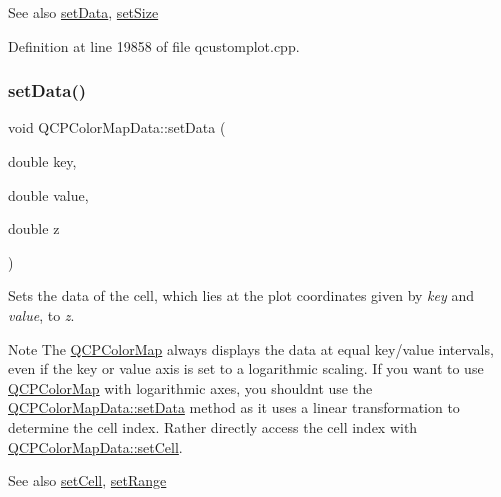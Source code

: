 \begin{DoxySeeAlso}{See also}
\hyperlink{class_q_c_p_color_map_data_afd2083ccfd6987ec94aa7ef8e91ca39a}{set\+Data}, \hyperlink{class_q_c_p_color_map_data_a0d9ff35c299d0478b682bfbcdd9c097e}{set\+Size} 
\end{DoxySeeAlso}


Definition at line 19858 of file qcustomplot.\+cpp.

\mbox{\label{class_q_c_p_color_map_data_afd2083ccfd6987ec94aa7ef8e91ca39a}} 
\subsubsection{\texorpdfstring{set\+Data()}{setData()}}
{\footnotesize\ttfamily void Q\+C\+P\+Color\+Map\+Data\+::set\+Data (\begin{DoxyParamCaption}\item[{double}]{key,  }\item[{double}]{value,  }\item[{double}]{z }\end{DoxyParamCaption})}

Sets the data of the cell, which lies at the plot coordinates given by {\itshape key} and {\itshape value}, to {\itshape z}.

\begin{DoxyNote}{Note}
The \hyperlink{class_q_c_p_color_map}{Q\+C\+P\+Color\+Map} always displays the data at equal key/value intervals, even if the key or value axis is set to a logarithmic scaling. If you want to use \hyperlink{class_q_c_p_color_map}{Q\+C\+P\+Color\+Map} with logarithmic axes, you shouldn\textquotesingle{}t use the \hyperlink{class_q_c_p_color_map_data_afd2083ccfd6987ec94aa7ef8e91ca39a}{Q\+C\+P\+Color\+Map\+Data\+::set\+Data} method as it uses a linear transformation to determine the cell index. Rather directly access the cell index with \hyperlink{class_q_c_p_color_map_data_a8e75eaf8746596319032a93f3d2d0683}{Q\+C\+P\+Color\+Map\+Data\+::set\+Cell}.
\end{DoxyNote}
\begin{DoxySeeAlso}{See also}
\hyperlink{class_q_c_p_color_map_data_a8e75eaf8746596319032a93f3d2d0683}{set\+Cell}, \hyperlink{class_q_c_p_color_map_data_aad9c1c7c703c1339489fc730517c83d4}{set\+Range} 
\end{DoxySeeAlso}


